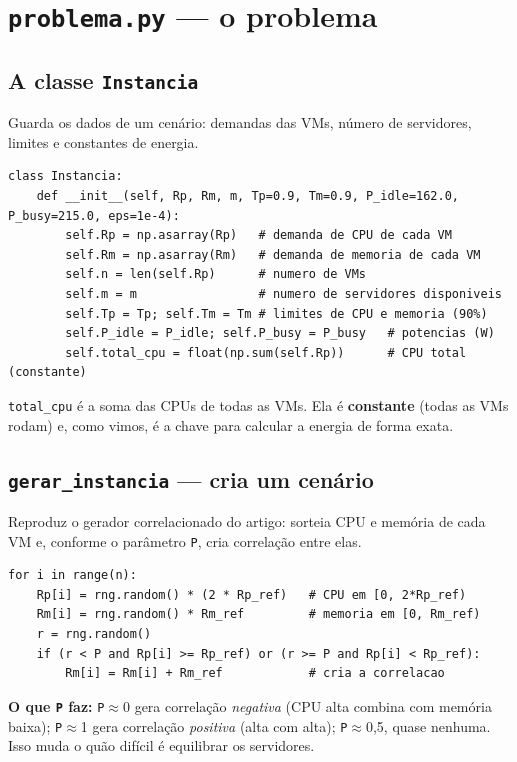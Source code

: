 \documentclass[11pt]{article}
\begin{document}
\section{\texttt{problema.py} --- o problema}
\subsection{A classe \texttt{Instancia}}
Guarda os dados de um cenário: demandas das VMs, número de servidores, limites e
constantes de energia.
\begin{lstlisting}
class Instancia:
    def __init__(self, Rp, Rm, m, Tp=0.9, Tm=0.9, P_idle=162.0, P_busy=215.0, eps=1e-4):
        self.Rp = np.asarray(Rp)   # demanda de CPU de cada VM
        self.Rm = np.asarray(Rm)   # demanda de memoria de cada VM
        self.n = len(self.Rp)      # numero de VMs
        self.m = m                 # numero de servidores disponiveis
        self.Tp = Tp; self.Tm = Tm # limites de CPU e memoria (90%)
        self.P_idle = P_idle; self.P_busy = P_busy   # potencias (W)
        self.total_cpu = float(np.sum(self.Rp))      # CPU total (constante)
\end{lstlisting}
\begin{ideia}
\texttt{total\_cpu} é a soma das CPUs de todas as VMs. Ela é \textbf{constante}
(todas as VMs rodam) e, como vimos, é a chave para calcular a energia de forma
exata.
\end{ideia}

\subsection{\texttt{gerar\_instancia} --- cria um cenário}
Reproduz o gerador correlacionado do artigo: sorteia CPU e memória de cada VM e,
conforme o parâmetro \texttt{P}, cria correlação entre elas.
\begin{lstlisting}
for i in range(n):
    Rp[i] = rng.random() * (2 * Rp_ref)   # CPU em [0, 2*Rp_ref)
    Rm[i] = rng.random() * Rm_ref         # memoria em [0, Rm_ref)
    r = rng.random()
    if (r < P and Rp[i] >= Rp_ref) or (r >= P and Rp[i] < Rp_ref):
        Rm[i] = Rm[i] + Rm_ref            # cria a correlacao
\end{lstlisting}
\begin{ideia}
\textbf{O que \texttt{P} faz:} \texttt{P}$\approx$0 gera correlação
\emph{negativa} (CPU alta combina com memória baixa); \texttt{P}$\approx$1 gera
correlação \emph{positiva} (alta com alta); \texttt{P}$\approx$0,5, quase nenhuma.
Isso muda o quão difícil é equilibrar os servidores.
\end{ideia}
\end{document}
